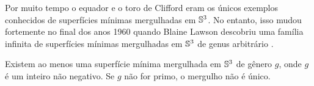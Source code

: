 




Por muito tempo o equador e o toro de Clifford eram os únicos exemplos conhecidos de superfícies mínimas mergulhadas em $\mathbb{S}^3$. No entanto, isso mudou fortemente no final dos anos 1960 quando Blaine Lawson descobriu uma família infinita de superfícies mínimas mergulhadas em $\mathbb{S}^3$ de genus arbitrário \cite{Lawson1970a}.

\begin{teorema}[Lawson]
	Existem ao menos uma superfície mínima mergulhada em $\mathbb{S}^3$ de gênero $g$, onde $g$ é um inteiro não negativo. Se $g$ não for primo, o mergulho não é único.
\end{teorema}




